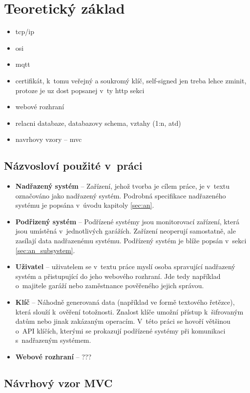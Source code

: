 \chapter{Teoretický základ}
\label{sec:te}
\begin{itemize}
    \item tcp/ip
    \item osi
    \item mqtt
    \item certifikát, k~tomu veřejný a soukromý klíč, self-signed jen treba lehce zminit, protoze je uz dost popsanej v~ty http sekci
    \item webové rozhraní
    \item relacni databaze, databazovy schema, vztahy (1:n, atd)
    \item navrhovy vzory -- mvc
\end{itemize}

\section{Názvosloví použité v~práci}

\begin{itemize}
    \item \textbf{Nadřazený systém} -- Zařízení, jehož tvorba je cílem práce, je v~textu označováno jako nadřazený systém. Podrobná specifikace nadřazeného systému je popsána v~úvodu kapitoly \ref{sec:an}.
    \item \textbf{Podřizený systém} -- Podřízené systémy jsou monitorovací zařízení, která jsou umístěná v~jednotlivých garážích. Zařízení neoperují samostatně, ale zasílají data nadřazenému systému. Podřízený systém je blíže popsán v~sekci \ref{sec:an_subsystem}.
    \item \textbf{Uživatel} -- uživatelem se v~textu práce myslí osoba spravující nadřazený systém a přistupující do jeho webového rozhraní. Jde tedy například o~majitele garáží nebo zaměstnance pověřeného jejich správou.
    \item \textbf{Klíč} -- Náhodně generovaná data (například ve formě textového řetězce), která slouží k~ověření totožnosti. Znalost klíče umožní přístup k~šifrovaným datům nebo jinak zakázaným operacím. V~této práci se hovoří většinou o~API klíčích, kterými se prokazují podřízené systémy při komunikaci s~nadřazeným systémem.
    \item \textbf{Webové rozhraní} -- ???
\end{itemize}

\section{Návrhový vzor MVC}

